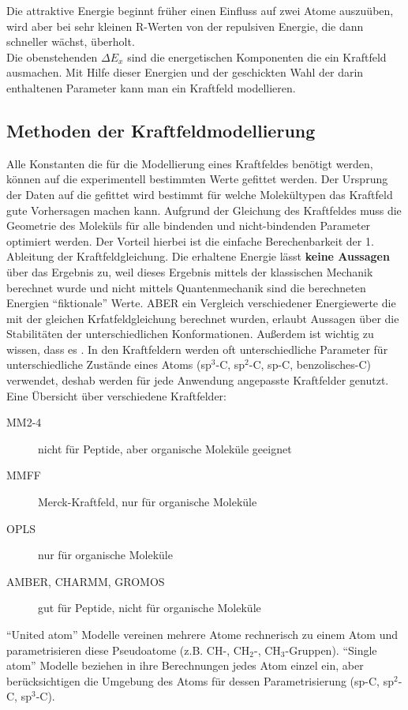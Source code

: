 \documentclass[12pt,a4paper,oneside,normalheadings,abstracton,liststotoc,bibtotoc,titlepage,pdftex]{scrartcl}
\begin{document}
Die attraktive Energie beginnt früher einen Einfluss auf zwei Atome auszuüben, wird aber bei sehr kleinen R-Werten von der repulsiven Energie, die dann schneller wächst, überholt.\\
Die obenstehenden $\Delta E_x$ sind die energetischen Komponenten die ein Kraftfeld ausmachen. Mit Hilfe dieser Energien und der geschickten Wahl der darin enthaltenen Parameter kann man ein Kraftfeld modellieren.

\subsection{Methoden der Kraftfeldmodellierung}
Alle Konstanten die für die Modellierung eines Kraftfeldes benötigt werden, können auf die experimentell bestimmten Werte gefittet werden. Der Ursprung der Daten auf die gefittet wird bestimmt für welche Molekültypen das Kraftfeld gute Vorhersagen machen kann. Aufgrund der Gleichung des Kraftfeldes muss die Geometrie des Moleküls für alle bindenden und nicht-bindenden Parameter optimiert werden. Der Vorteil hierbei ist die einfache Berechenbarkeit der 1. Ableitung der Kraftfeldgleichung. Die erhaltene Energie lässt \textbf{keine Aussagen} über das Ergebnis zu, weil dieses Ergebnis mittels der klassischen Mechanik berechnet wurde und nicht mittels Quantenmechanik sind die berechneten Energien ``fiktionale'' Werte. ABER ein Vergleich verschiedener Energiewerte die mit der gleichen Krfatfeldgleichung berechnet wurden, erlaubt Aussagen über die Stabilitäten der unterschiedlichen Konformationen. Außerdem ist wichtig zu wissen, dass es . In den Kraftfeldern werden oft unterschiedliche Parameter für unterschiedliche Zustände eines Atoms (sp$^3$-C, sp$^2$-C, sp-C, benzolisches-C) verwendet, deshab werden für jede Anwendung angepasste Kraftfelder genutzt.\\
Eine Übersicht über verschiedene Kraftfelder:
\begin{description}
\item[MM2-4] nicht für Peptide, aber organische Moleküle geeignet
\item[MMFF] Merck-Kraftfeld, nur für organische Moleküle
\item[OPLS] nur für organische Moleküle
\item[AMBER, CHARMM, GROMOS] gut für Peptide, nicht für organische Moleküle 
\end{description}
``United atom'' Modelle vereinen mehrere Atome rechnerisch zu einem Atom und parametrisieren diese Pseudoatome (z.B. CH-, CH$_2$-, CH$_3$-Gruppen). ``Single atom'' Modelle beziehen in ihre Berechnungen jedes Atom einzel ein, aber berücksichtigen die Umgebung des Atoms für dessen Parametrisierung (sp-C, sp$^2$-C, sp$^3$-C).
\end{document}
